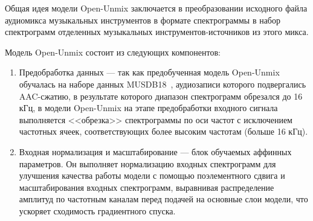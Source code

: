 \documentclass[14pt]{extarticle}
\begin{document}
Общая идея модели Open-Unmix заключается в преобразовании исходного файла аудиомикса музыкальных 
инструментов в формате спектрограммы в набор спектрограмм отделенных музыкальных инструментов-источников из 
этого микса.

Модель Open-Unmix состоит из следующих компонентов:
\begin{enumerate}[label=\arabic*)]
\item Предобработка данных --- так как предобученная модель Open-Unmix обучалась на наборе данных MUSDB18~\cite{MUSDB18}, аудиозаписи которого 
подвергались AAC-сжатию, в результате которого диапазон спектрограмм обрезался до 16 кГц, в модели Open-Unmix на этапе предобработки
 входного сигнала выполняется <<обрезка>> спектрограммы по оси частот с исключением частотных ячеек, соответствующих более высоким частотам (больше 16 кГц).

\item Входная нормализация и масштабирование --- блок обучаемых аффинных параметров. Он выполняет нормализацию входных 
спектрограмм для улучшения качества работы модели с помощью поэлементного сдвига и масштабирования входных спектрограмм,
выравнивая распределение амплитуд по частотным каналам перед подачей на основные слои модели,
что ускоряет сходимость градиентного спуска.


\end{enumerate}
\end{document}
